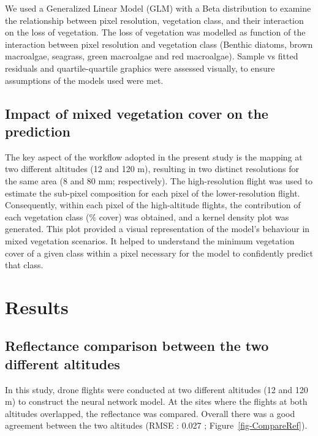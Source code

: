 \documentclass[
  letterpaper,
  11pt,
  english,
  singlespacing,
  headsepline]{MastersDoctoralThesis}
\begin{document}
\begin{spacing}{1.5}
We used a Generalized Linear Model (GLM) with a Beta distribution to
examine the relationship between pixel resolution, vegetation class, and
their interaction on the loss of vegetation. The loss of vegetation was
modelled as function of the interaction between pixel resolution and
vegetation class (Benthic diatoms, brown macroalgae, seagrass, green
macroalgae and red macroalgae). Sample vs fitted residuals and
quartile-quartile graphics were assessed visually, to ensure assumptions
of the models used were met.

\subsection{Impact of mixed vegetation cover on the
prediction}\label{impact-of-mixed-vegetation-cover-on-the-prediction}

The key aspect of the workflow adopted in the present study is the
mapping at two different altitudes (12 and 120 m), resulting in two
distinct resolutions for the same area (8 and 80 mm; respectively). The
high-resolution flight was used to estimate the sub-pixel composition
for each pixel of the lower-resolution flight. Consequently, within each
pixel of the high-altitude flights, the contribution of each vegetation
class (\% cover) was obtained, and a kernel density plot was generated.
This plot provided a visual representation of the model's behaviour in
mixed vegetation scenarios. It helped to understand the minimum
vegetation cover of a given class within a pixel necessary for the model
to confidently predict that class.

\section{Results}\label{results-1}

\subsection{Reflectance comparison between the two different
altitudes}\label{reflectance-comparison-between-the-two-different-altitudes}

In this study, drone flights were conducted at two different altitudes
(12 and 120 m) to construct the neural network model. At the sites where
the flights at both altitudes overlapped, the reflectance was compared.
Overall there was a good agreement between the two altitudes (RMSE :
0.027 ; Figure~\ref{fig-CompareRef}).

\begin{figure}


\end{figure}
\end{spacing}
\end{document}
